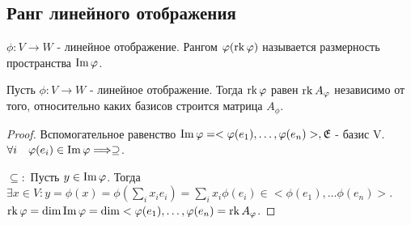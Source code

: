 \subsection{Ранг линейного отображения}
\begin{definition}
	\(\phi:V\to W\) - линейное отображение. Рангом \(\varphi(\operatorname{rk} \varphi)\) называется размерность пространства \(\operatorname{Im} \varphi\).
\end{definition}
\begin{theorem}
	Пусть \(\phi:V\to W\) - линейное отображение. Тогда \(\operatorname{rk} \varphi\) равен \(\operatorname{rk} A_{\varphi}\) независимо от того, относительно каких базисов строится матрица \(A_\phi\).
\end{theorem}
\begin{proof}
	Вспомогательное равенство \(\operatorname{Im}\varphi = <\varphi(e_1), \ldots, \varphi(e_n)>, \mathfrak{E}\) - базис V. \(\forall i \quad \varphi(e_i)\in\operatorname{Im}\varphi\Longrightarrow \supseteq\). 
	
	\(\subseteq:\) Пусть \(y\in \operatorname{Im}\varphi\). Тогда \(\exists x\in V: y = \phi(x) = \phi(\sum_i x_ie_i) = \sum_i x_i\phi(e_i)\in <\phi(e_1), \ldots \phi(e_n)>\). \(\operatorname{rk} \varphi = \dim \operatorname{Im}\varphi = \dim <\varphi(e_1), \ldots, \varphi(e_n) = \operatorname{rk} A_{\varphi}\).
\end{proof}
